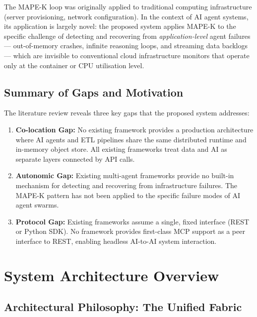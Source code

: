 \documentclass[12pt, a4paper]{report}
\begin{document}
The MAPE-K loop was originally applied to traditional computing infrastructure
(server provisioning, network configuration).
In the context of AI agent systems, its application is largely novel:
the proposed system applies MAPE-K to the specific challenge of detecting and recovering
from \emph{application-level} agent failures — out-of-memory crashes, infinite reasoning
loops, and streaming data backlogs — which are invisible to conventional cloud
infrastructure monitors that operate only at the container or CPU utilisation level.

\section{Summary of Gaps and Motivation}
\label{sec:gaps}

The literature review reveals three key gaps that the proposed system addresses:

\begin{enumerate}

  \item \textbf{Co-location Gap:} No existing framework provides a production architecture
  where AI agents and ETL pipelines share the same distributed runtime and in-memory
  object store. All existing frameworks treat data and AI as separate layers connected by
  API calls.

  \item \textbf{Autonomic Gap:} Existing multi-agent frameworks provide no built-in
  mechanism for detecting and recovering from infrastructure failures. The MAPE-K pattern
  has not been applied to the specific failure modes of AI agent swarms.

  \item \textbf{Protocol Gap:} Existing frameworks assume a single, fixed interface (REST
  or Python SDK). No framework provides first-class MCP support as a peer interface to
  REST, enabling headless AI-to-AI system interaction.

\end{enumerate}

\chapter{System Architecture Overview}
\label{ch:architecture}

\section{Architectural Philosophy: The Unified Fabric}
\label{sec:unified_fabric}
\end{document}
